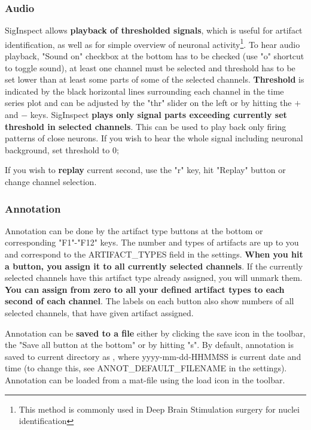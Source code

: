 \documentclass[a4paper,10pt]{article}
\begin{document}
\subsubsection{Audio}
SigInspect allows \textbf{playback of thresholded signals}, which is useful for artifact identification, as well as for simple overview of neuronal activity\footnote{This method is commonly used in Deep Brain Stimulation surgery for nuclei identification}. To hear audio playback, "Sound on" checkbox at the bottom has to be checked (use "o" shortcut to toggle sound), at least one channel must be selected and threshold has to be set lower than at least some parts of some of the selected channels. \textbf{Threshold} is indicated by the black horizontal lines surrounding each channel in the time series plot and can be adjusted by the "thr" slider on the left or by hitting the  $+$ and $-$ keys. SigInspect \textbf{plays only signal parts exceeding currently set threshold in selected channels}. This can be used to play back only firing patterns of close neurons. If you wish to hear the whole signal including neuronal background, set threshold to 0;

If you wish to \textbf{replay} current second, use the "r" key, hit "Replay" button or change channel selection.

\subsubsection{Annotation}
Annotation can be done by the artifact type buttons at the bottom or corresponding "F1"-"F12" keys. The number and types of artifacts are up to you and correspond to the ARTIFACT\_TYPES field in the settings. \textbf{When you hit a button, you assign it to all currently selected channels}. If the currently selected channels have this artifact type already assigned, you will unmark them. \textbf{You can assign from zero to all your defined artifact types to each second of each channel}. The labels on each button also show numbers of all selected channels, that have given artifact assigned.

Annotation can be \textbf{saved to a  file} either by clicking the save icon in the toolbar, the "Save all button at the bottom" or by hitting "s". By default, annotation is saved to current directory as , where yyyy-mm-dd-HHMMSS is current date and time (to change this, see ANNOT\_DEFAULT\_FILENAME in the settings). Annotation can be loaded from a mat-file using the load icon in the toolbar.
\end{document}
